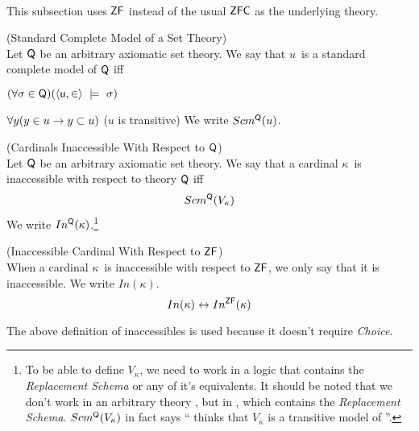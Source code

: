 
\

This subsection uses $\sf{ZF}$ instead of the usual $\sf{ZFC}$ as the underlying theory. %

\begin{definition}{(Standard Complete Model of a Set Theory)}\label{def:scm_q}\\
Let $\sf{Q}$ be an arbitrary axiomatic set theory.
We say that $u$ is a standard complete model of $\sf{Q}$ iff
\bce[(i)]
\item $(\forall \sigma \in \sf{Q})(\langle u, \in \rangle~\models~\sigma)$
\item $\forall y (y \in u \then y \subset u)$ ($u$ is transitive)
\ece 
We write $Scm^{\sf{Q}}(u)$.
\end{definition}

\begin{definition}{(Cardinals Inaccessible With Respect to $\sf{Q}$)}\label{def:levy_inaccessible_q}\\
Let $\sf{Q}$ be an arbitrary axiomatic set theory. We say that a cardinal $\kappa$ is inaccessible with respect to theory $\sf{Q}$ iff
\begin{equation}
Scm^{\sf{Q}}(V_\kappa)
\end{equation}
We write $In^{\sf{Q}}(\kappa)$.\footnote{To be able to define $V_\kappa$, we need to work in a logic that contains the \emph{Replacement Schema} or any of it's equivalents. It should be noted that we don't work in an arbitrary theory , but in , which contains the \emph{Replacement Schema}. $Scm^{\sf{Q}}(V_\kappa)$ in fact says `` thinks that $V_\kappa$ is a transitive model of ''.}
\end{definition}

\begin{definition}{(Inaccessible Cardinal With Respect to $\sf{ZF}$)}\label{def:levy_inaccessible}\\
When a cardinal $\kappa$ is inaccessible with respect to $\sf{ZF}$, we only say that it is inaccessible. We write $In(\kappa)$.
\begin{equation}
In(\kappa) \iff In^{\sf{ZF}}(\kappa)
\end{equation}
\end{definition}
The above definition of inaccessibles is used because it doesn't require \emph{Choice}.

